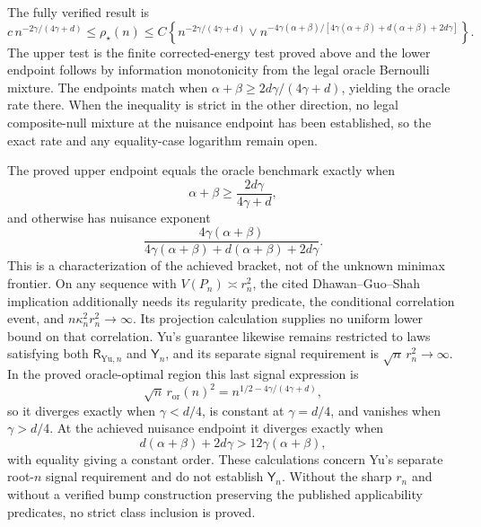 The fully verified result is
\[
 c\,n^{-2\gamma/(4\gamma+d)}
 \le\rho_\star(n)
 \le C\left\{n^{-2\gamma/(4\gamma+d)}
 \vee n^{-4\gamma(\alpha+\beta)/[4\gamma(\alpha+\beta)+d(\alpha+\beta)+2d\gamma]}\right\}.
\]
The upper test is the finite corrected-energy test proved above and the lower endpoint follows by information monotonicity from the legal oracle Bernoulli mixture.  The endpoints match when \(\alpha+\beta\ge2d\gamma/(4\gamma+d)\), yielding the oracle rate there.  When the inequality is strict in the other direction, no legal composite-null mixture at the nuisance endpoint has been established, so the exact rate and any equality-case logarithm remain open.

The proved upper endpoint equals the oracle benchmark exactly when
\[
 \alpha+\beta\ge\frac{2d\gamma}{4\gamma+d},
\]
and otherwise has nuisance exponent
\[
 \frac{4\gamma(\alpha+\beta)}{4\gamma(\alpha+\beta)+d(\alpha+\beta)+2d\gamma}.
\]
This is a characterization of the achieved bracket, not of the unknown minimax frontier.  On any sequence with \(V(P_n)\asymp r_n^2\), the cited Dhawan--Guo--Shah implication additionally needs its regularity predicate, the conditional correlation event, and \(n\kappa_n^2r_n^2\to\infty\).  Its projection calculation supplies no uniform lower bound on that correlation.  Yu's guarantee likewise remains restricted to laws satisfying both \(\mathsf R_{\mathrm{Yu},n}\) and \(\mathsf Y_n\), and its separate signal requirement is \(\sqrt n\,r_n^2\to\infty\).
In the proved oracle-optimal region this last signal expression is
\[
 \sqrt n\,r_{\mathrm{or}}(n)^2
 =n^{1/2-4\gamma/(4\gamma+d)},
\]
so it diverges exactly when \(\gamma<d/4\), is constant at \(\gamma=d/4\), and vanishes when \(\gamma>d/4\).  At the achieved nuisance endpoint it diverges exactly when
\[
 d(\alpha+\beta)+2d\gamma>12\gamma(\alpha+\beta),
\]
with equality giving a constant order.  These calculations concern Yu's separate root-\(n\) signal requirement and do not establish \(\mathsf Y_n\).  Without the sharp \(r_n\) and without a verified bump construction preserving the published applicability predicates, no strict class inclusion is proved.
